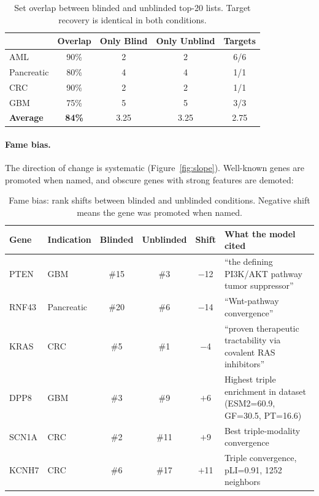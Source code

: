 \documentclass[sigconf, nonacm]{acmart}
\begin{document}
\begin{table}[h]
\centering
\small
\begin{tabular}{@{}lcccc@{}}
\toprule
& \textbf{Overlap} & \textbf{Only Blind} & \textbf{Only Unblind} & \textbf{Targets} \\
\midrule
AML & 90\% & 2 & 2 & 6/6 \\
Pancreatic & 80\% & 4 & 4 & 1/1 \\
CRC & 90\% & 2 & 2 & 1/1 \\
GBM & 75\% & 5 & 5 & 3/3 \\
\midrule
\textbf{Average} & \textbf{84\%} & 3.25 & 3.25 & 2.75 \\
\bottomrule
\end{tabular}
\caption{Set overlap between blinded and unblinded top-20 lists. Target recovery is identical in both conditions.}
\label{tab:overlap}
\end{table}

\paragraph{Fame bias.} The direction of change is systematic (Figure~\ref{fig:slope}). Well-known genes are promoted when named, and obscure genes with strong features are demoted:

\begin{table}[h]
\centering
\footnotesize
\setlength{\tabcolsep}{3pt}
\begin{tabular}{@{}llccc>{\raggedright\arraybackslash}p{2.8cm}@{}}
\toprule
\textbf{Gene} & \textbf{Indication} & \textbf{Blinded} & \textbf{Unblinded} & \textbf{Shift} & \textbf{What the model cited} \\
\midrule
PTEN & GBM & \#15 & \#3 & $-$12 & ``the defining PI3K/AKT pathway tumor suppressor'' \\
RNF43 & Pancreatic & \#20 & \#6 & $-$14 & ``Wnt-pathway convergence'' \\
KRAS & CRC & \#5 & \#1 & $-$4 & ``proven therapeutic tractability via covalent RAS inhibitors'' \\
DPP8 & GBM & \#3 & \#9 & $+$6 & Highest triple enrichment in dataset (ESM2=60.9, GF=30.5, PT=16.6) \\
SCN1A & CRC & \#2 & \#11 & $+$9 & Best triple-modality convergence \\
KCNH7 & CRC & \#6 & \#17 & $+$11 & Triple convergence, pLI=0.91, 1252 neighbors \\
\bottomrule
\end{tabular}
\caption{Fame bias: rank shifts between blinded and unblinded conditions. Negative shift means the gene was promoted when named.}
\label{tab:famebias}
\end{table}
\end{document}
